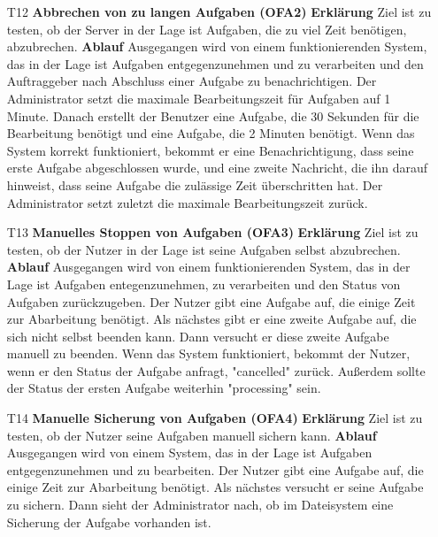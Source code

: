 \documentclass[a4paper,12pt]{article}
\begin{document}
\begin{itemize}

\item[T12] \textbf{Abbrechen von zu langen Aufgaben (OFA2)}
\subitem \textbf{Erklärung} Ziel ist zu testen, ob der Server in der Lage ist Aufgaben, die zu viel Zeit benötigen, abzubrechen.
\subitem \textbf{Ablauf} Ausgegangen wird von einem funktionierenden System, das in der Lage ist Aufgaben entgegenzunehmen und zu verarbeiten und den Auftraggeber nach Abschluss einer Aufgabe zu benachrichtigen.
Der Administrator setzt die maximale Bearbeitungszeit für Aufgaben auf 1 Minute.
Danach erstellt der Benutzer eine Aufgabe, die 30 Sekunden für die Bearbeitung benötigt und eine Aufgabe, die 2 Minuten benötigt.
Wenn das System korrekt funktioniert, bekommt er eine Benachrichtigung, dass seine erste Aufgabe abgeschlossen wurde,
und eine zweite Nachricht, die ihn darauf hinweist, dass seine Aufgabe die zulässige Zeit überschritten hat.
Der Administrator setzt zuletzt die maximale Bearbeitungszeit zurück.

\item[T13] \textbf{Manuelles Stoppen von Aufgaben (OFA3)}
\subitem \textbf{Erklärung} Ziel ist zu testen, ob der Nutzer in der Lage ist seine Aufgaben selbst abzubrechen.
\subitem \textbf{Ablauf} Ausgegangen wird von einem funktionierenden System, das in der Lage ist Aufgaben entegenzunehmen, zu verarbeiten und den Status von Aufgaben zurückzugeben.
Der Nutzer gibt eine Aufgabe auf, die einige Zeit zur Abarbeitung benötigt. Als nächstes gibt er eine zweite Aufgabe auf, die sich nicht selbst beenden kann.
Dann versucht er diese zweite Aufgabe manuell zu beenden. Wenn das System funktioniert, bekommt der Nutzer, wenn er den Status der Aufgabe anfragt, "cancelled" zurück.
Außerdem sollte der Status der ersten Aufgabe weiterhin "processing" sein.

\item[T14] \textbf{Manuelle Sicherung von Aufgaben (OFA4)}
\subitem \textbf{Erklärung} Ziel ist zu testen, ob der Nutzer seine Aufgaben manuell sichern kann.
\subitem \textbf{Ablauf} Ausgegangen wird von einem System, das in der Lage ist Aufgaben entgegenzunehmen und zu bearbeiten.
Der Nutzer gibt eine Aufgabe auf, die einige Zeit zur Abarbeitung benötigt.
Als nächstes versucht er seine Aufgabe zu sichern.
Dann sieht der Administrator nach, ob im Dateisystem eine Sicherung der Aufgabe vorhanden ist.

\end{itemize}

\clearpage
\printnoidxglossaries
\end{document}
